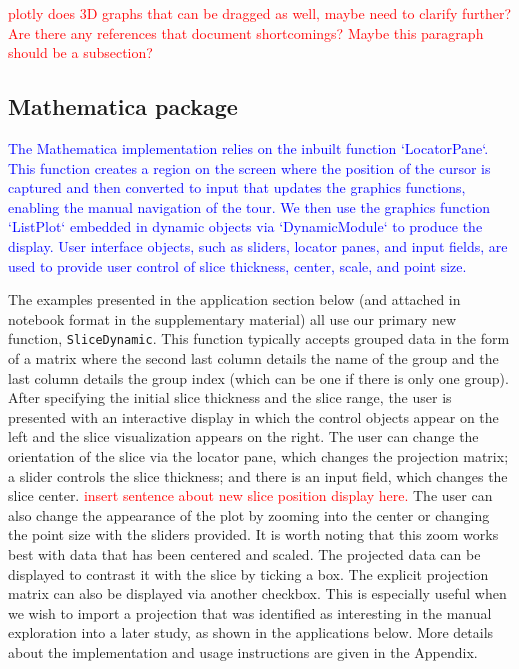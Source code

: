 \documentclass[]{interact}
\theoremstyle{plain}%
\theoremstyle{definition}
\theoremstyle{remark}
\begin{document}
\textcolor{red}{plotly does 3D graphs that can be dragged as well, maybe need to clarify further? Are there any references that document shortcomings? Maybe this paragraph should be a subsection?}

\hypertarget{mathematica-package}{%
\subsection{Mathematica package}\label{mathematica-package}}

\textcolor{blue}{The Mathematica implementation relies on the inbuilt function  `LocatorPane`. This function creates a region on the screen where the position of the cursor is captured and then converted to input that updates the graphics functions, enabling the manual navigation of the tour. We then use the graphics function `ListPlot` embedded in dynamic objects via  `DynamicModule` to produce the display. User interface objects, such as sliders, locator panes, and input fields, are used to provide user control of slice thickness, center, scale, and point size.}

The examples presented in the application section below (and attached in
notebook format in the supplementary material) all use our primary new
function, \texttt{SliceDynamic}. This function typically accepts grouped
data in the form of a matrix where the second last column details the
name of the group and the last column details the group index (which can
be one if there is only one group). After specifying the initial slice
thickness and the slice range, the user is presented with an interactive
display in which the control objects appear on the left and the slice
visualization appears on the right. The user can change the orientation
of the slice via the locator pane, which changes the projection matrix;
a slider controls the slice thickness; and there is an input field,
which changes the slice center.
\textcolor{red}{insert sentence about new slice position display here.}
The user can also change the appearance of the plot by zooming into the
center or changing the point size with the sliders provided. It is worth
noting that this zoom works best with data that has been centered and
scaled. The projected data can be displayed to contrast it with the
slice by ticking a box. The explicit projection matrix can also be
displayed via another checkbox. This is especially useful when we wish
to import a projection that was identified as interesting in the manual
exploration into a later study, as shown in the applications below. More
details about the implementation and usage instructions are given in the
Appendix.
\end{document}
